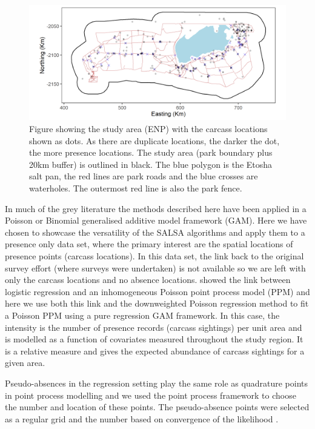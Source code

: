\documentclass[letterpaper]{interact}
\begin{document}
\begin{figure}[!htb]
\centering
\includegraphics[width=0.9\linewidth]{images/rawdataplot.jpg}
\caption{Figure showing the study area (ENP) with the carcass locations shown as dots. As there are duplicate locations, the darker the dot, the more presence locations. The study area (park boundary plus 20km buffer) is outlined in black. The blue polygon is the Etosha salt pan, the red lines are park roads and the blue crosses are waterholes. The outermost red line is also the park fence.}
\label{fig:raw}
\end{figure}

In much of the grey literature the methods described here have been applied in a Poisson or Binomial generalised additive model framework (GAM).  Here we have chosen to showcase the versatility of the SALSA algorithms and apply them to a presence only data set, where the primary interest are the spatial locations of presence points (carcass locations). In this data set, the link back to the original survey effort (where surveys were undertaken) is not available so we are left with only the carcass locations and no absence locations. \citet{warton2010} showed the link between logistic regression and an inhomogeneous Poisson point process model (PPM) and here we use both this link and the downweighted Poisson regression method \cite{renner2013} to fit a Poisson PPM using a pure regression GAM framework. In this case, the intensity is the number of presence records (carcass sightings) per unit area and is modelled as a function of covariates measured throughout the study region. It is a relative measure and gives the expected abundance of carcass sightings for a given area. 

Pseudo-absences in the regression setting play the same role as quadrature points in point process modelling and we used the point process framework to choose the number and location of these points.  The pseudo-absence points were selected as a regular grid and the number based on convergence of the likelihood \cite{renner2013}.
\end{document}
